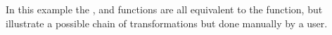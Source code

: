 
In this example the ,  and 
functions are all equivalent to the  function, but illustrate
a possible chain of transformations but done manually by a user.

